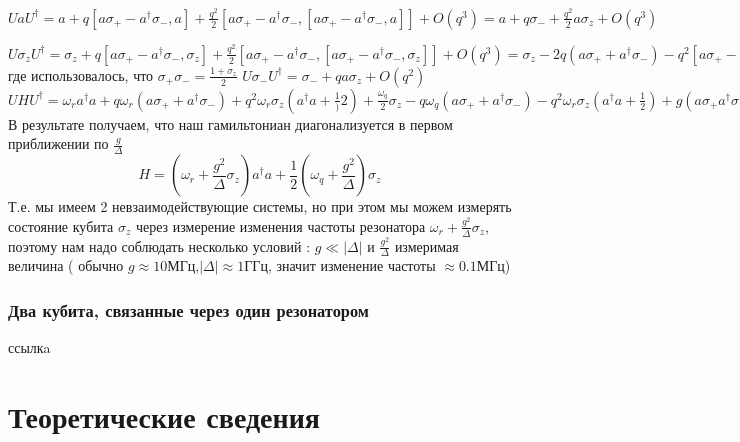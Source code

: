 \documentclass[12pt, twoside]{report}
\begin{document}
\begin{center}
$
UaU^{\dagger} = a +q[a\sigma_+-a^{\dagger}\sigma_-,a]+
\frac{q^2}{2}[a\sigma_+-a^{\dagger}\sigma_-,[a\sigma_+-a^{\dagger}\sigma_-,a]]+O(q^3)=
a+q\sigma_-+\frac{q^2}{2}a\sigma_z+O(q^3)
$

$
U\sigma_zU^{\dagger} = \sigma_z +q[a\sigma_+-a^{\dagger}\sigma_-,\sigma_z]+
\frac{q^2}{2}[a\sigma_+-a^{\dagger}\sigma_-,[a\sigma_+-a^{\dagger}\sigma_-,\sigma_z]]+O(q^3)=
\sigma_z-2q(a\sigma_++a^{\dagger}\sigma_-)-q^2
[a\sigma_+- 
a^{\dagger}\sigma_-,a\sigma_++a^{\dagger}\sigma_-]+O(q^3)=
\sigma_z-2q(a\sigma_++a^{\dagger}\sigma_-)-q^2\sigma_z
(1+2a^{\dagger}a)+O(q^3)
$
где использовалось, что $\sigma_+\sigma_-=
\frac{1+\sigma_z}{2}$
$U\sigma_-U^{\dagger}=\sigma_-+qa\sigma_z+O(q^2)$
$
UHU^{\dagger}=\omega_r a^{\dagger}a+
q\omega_r(a\sigma_++a^{\dagger}\sigma_-)+
q^2\omega_r\sigma_z(a^{\dagger}a+\frac{1}){2})+\frac{\omega_q}{2}\sigma_z-
q\omega_q(a\sigma_++a^{\dagger}\sigma_-)
-q^2\omega_r\sigma_z(a^{\dagger}a+\frac{1}{2})+
g(a\sigma_+a^{\dagger}\sigma_-)+qg\sigma_z(2a^{\dagger}a+1)+
gO(q^2)=\omega_r a^{\dagger}a+\frac{\omega_z}{2}\sigma_z+
qg\sigma_z(a^{\dagger}a+\frac{1}{2})+O(q^2)
$
В результате получаем, что наш гамильтониан диагонализуется
в первом приближении по $\frac{g}{\Delta}$
\begin{equation}
H=(\omega_r+\frac{g^2}{\Delta}\sigma_z)a^{\dagger}a + 
\frac{1}{2}(\omega_q+\frac{g^2}{\Delta})\sigma_z
\end{equation} 
Т.е. мы имеем 2 невзаимодействующие системы, но при этом мы можем измерять состояние кубита $\sigma_z$ через измерение изменения
частоты резонатора $\omega_r+\frac{g^2}{\Delta}\sigma_z$, поэтому нам надо соблюдать несколько условий : $g\ll|\Delta|$ и 
$\frac{g^2}{\Delta}$ измеримая величина ( обычно $g\approx10$МГц,$|\Delta|\approx1$ГГц, значит изменение частоты $\approx0.1$МГц)
\end{center}
		\subsection{Два кубита, связанные через один резонатором}
ссылкa\cite{Gu2017}





\chapter{Теоретические сведения} \label{chap:theory}
\end{document}

